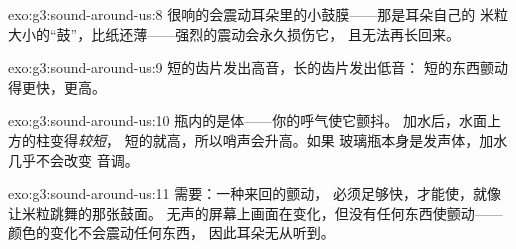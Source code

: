 \begin{solution}{exo:g3:sound-around-us:8}
很响的会震动耳朵里的小鼓膜——那是耳朵自己的
米粒大小的“鼓”，比纸还薄——强烈的震动会永久损伤它，
且无法再长回来。
\end{solution}

\begin{solution}{exo:g3:sound-around-us:9}
短的齿片发出高音，长的齿片发出低音：
短的东西颤动得更快，更高。
\end{solution}

\begin{solution}{exo:g3:sound-around-us:10}
瓶内的是体——你的呼气使它颤抖。
加水后，水面上方的柱变得\emph{较短}，
短的就高，所以哨声会升高。如果
玻璃瓶本身是发声体，加水几乎不会改变
音调。
\end{solution}

\begin{solution}{exo:g3:sound-around-us:11}
需要\emph{}：一种来回的颤动，
必须足够快，才能使，就像让米粒跳舞的那张鼓面。
无声的屏幕上画面在变化，但没有任何东西使颤动——
颜色的变化不会震动任何东西，
因此耳朵无从听到。
\end{solution}
